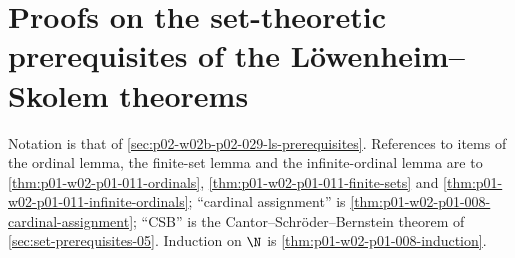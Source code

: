 \section{Proofs on the set-theoretic prerequisites of the L\"owenheim--Skolem theorems}
\label{sec:annex-p02-w02b-p02-029-ls-prerequisites}

Notation is that of \cref{sec:p02-w02b-p02-029-ls-prerequisites}. References
to items of the ordinal lemma, the finite-set lemma and the infinite-ordinal
lemma are to \cref{thm:p01-w02-p01-011-ordinals},
\cref{thm:p01-w02-p01-011-finite-sets} and
\cref{thm:p01-w02-p01-011-infinite-ordinals}; ``cardinal assignment'' is
\cref{thm:p01-w02-p01-008-cardinal-assignment}; ``CSB'' is the
Cantor--Schr\"oder--Bernstein theorem of \cref{sec:set-prerequisites-05}.
Induction on \(\N\) is \cref{thm:p01-w02-p01-008-induction}.


